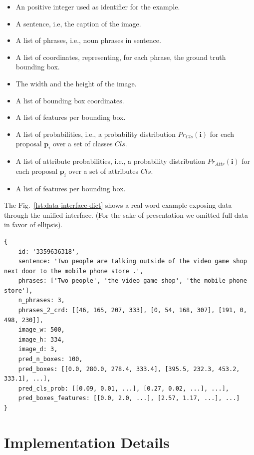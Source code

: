 \begin{itemize}
  \item An positive integer used as identifier for the example.
  \item A sentence, i.e, the caption of the image.
  \item A list of phrases, i.e., noun phrases in sentence.
  \item A list of coordinates, representing, for each phrase, the
  ground truth bounding box.
  \item The width and the height of the image.
  \item A list of bounding box coordinates.
  \item A list of features per bounding box.
  \item A list of probabilities, i.e., a probability distribution
  $Pr_{Cls}(\bm{i})$ for each proposal $\bm{p}_i$ over a set of
  classes $Cls$.
  \item A list of attribute probabilities, i.e., a probability
  distribution $Pr_{Attr}(\bm{i})$ for each proposal $\bm{p}_i$ over a
  set of attributes $Cls$.
  \item A list of features per bounding box.
\end{itemize}

The Fig.~\ref{lst:data-interface-dict} shows a real word example
exposing data through the unified interface. (For the sake of
presentation we omitted full data in favor of ellipsis).

\begin{lstlisting}[style=simplepython,caption=Example of our data structure for as interface to row data.,label={lst:data-interface-dict},captionpos=b]
{
    id: '3359636318', 
    sentence: 'Two people are talking outside of the video game shop next door to the mobile phone store .', 
    phrases: ['Two people', 'the video game shop', 'the mobile phone store'], 
    n_phrases: 3, 
    phrases_2_crd: [[46, 165, 207, 333], [0, 54, 168, 307], [191, 0, 498, 230]], 
    image_w: 500, 
    image_h: 334, 
    image_d: 3, 
    pred_n_boxes: 100, 
    pred_boxes: [[0.0, 280.0, 278.4, 333.4], [395.5, 232.3, 453.2, 333.1], ...], 
    pred_cls_prob: [[0.09, 0.01, ...], [0.27, 0.02, ...], ...],
    pred_boxes_features: [[0.0, 2.0, ...], [2.57, 1.17, ...], ...]
}
\end{lstlisting}

\section{Implementation Details}
\label{sec:impl-details}

